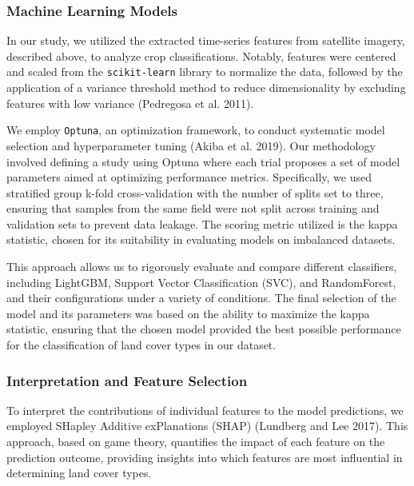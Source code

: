 \documentclass[
  journal,
  twocolumn]{IEEEtran}
\begin{document}
\hypertarget{machine-learning-models}{%
\subsubsection{Machine Learning Models}\label{machine-learning-models}}

In our study, we utilized the extracted time-series features from
satellite imagery, described above, to analyze crop classifications.
Notably, features were centered and scaled from the
\texttt{scikit-learn} library to normalize the data, followed by the
application of a variance threshold method to reduce dimensionality by
excluding features with low variance (Pedregosa et al. 2011).

We employ \texttt{Optuna}, an optimization framework, to conduct
systematic model selection and hyperparameter tuning (Akiba et al.
2019). Our methodology involved defining a study using Optuna where each
trial proposes a set of model parameters aimed at optimizing performance
metrics. Specifically, we used stratified group k-fold cross-validation
with the number of splits set to three, ensuring that samples from the
same field were not split across training and validation sets to prevent
data leakage. The scoring metric utilized is the kappa statistic, chosen
for its suitability in evaluating models on imbalanced datasets.

This approach allows us to rigorously evaluate and compare different
classifiers, including LightGBM, Support Vector Classification (SVC),
and RandomForest, and their configurations under a variety of
conditions. The final selection of the model and its parameters was
based on the ability to maximize the kappa statistic, ensuring that the
chosen model provided the best possible performance for the
classification of land cover types in our dataset.

\hypertarget{interpretation-and-feature-selection}{%
\subsubsection{Interpretation and Feature
Selection}\label{interpretation-and-feature-selection}}

To interpret the contributions of individual features to the model
predictions, we employed SHapley Additive exPlanations (SHAP) (Lundberg
and Lee 2017). This approach, based on game theory, quantifies the
impact of each feature on the prediction outcome, providing insights
into which features are most influential in determining land cover
types.
\end{document}
